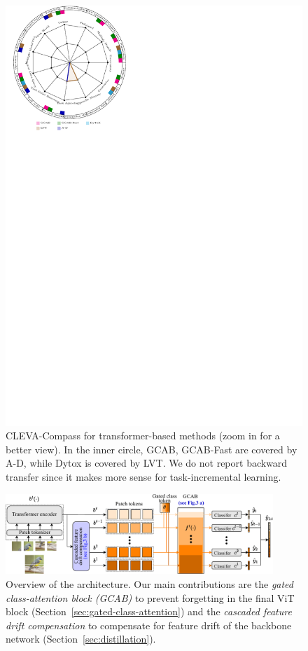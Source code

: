 \documentclass[twocolumn]{svjour3}          %
\begin{document}
\begin{figure}
    \centering
    \includegraphics[width=.95\linewidth]{images/cleva.pdf}
    \caption{CLEVA-Compass for transformer-based methods (zoom in for a better view). In the inner circle, GCAB, GCAB-Fast are covered by A-D, while Dytox is covered by LVT. We do not report backward transfer since it makes more sense for task-incremental learning.}
    \label{fig:cleva}
\end{figure}

\begin{figure}[tb]
\begin{center}
\includegraphics[width=0.9\textwidth]{images/maskformer.pdf}
\end{center}
\caption{Overview of the architecture. Our main contributions are the \emph{gated class-attention block (GCAB)} to prevent forgetting in the final ViT block (Section~\ref{sec:gated-class-attention}) and the \emph{cascaded feature drift compensation} to compensate for feature drift of the backbone network (Section~\ref{sec:distillation}).}
\label{fig:trasf}
\end{figure}
\end{document}
